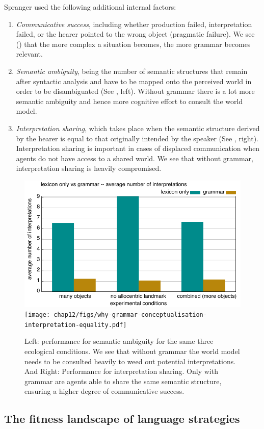Spranger used the following additional internal factors: 
\begin{enumerate}
\item {\itshape Communicative success}, including whether production failed, interpretation failed, or the hearer pointed to the wrong 
object (pragmatic failure). We see () that the more complex a situation becomes, the 
more grammar becomes relevant. 
\item {\itshape Semantic ambiguity}, being the number of semantic structures that remain after syntactic analysis and have to be mapped 
onto the perceived world in order to be disambiguated (See , left). Without grammar there is a lot 
more semantic ambiguity and hence more cognitive effort to consult the world model. 
\item {\itshape Interpretation sharing}, which takes place when the semantic structure derived by the hearer is equal to that originally 
intended by the speaker (See , right). Interpretation sharing is important in cases of displaced 
communication when agents do not have access to a shared world. We see that without grammar, interpretation sharing is 
heavily compromised. 
\end{enumerate}


\begin{figure}
\centerline{\includegraphics[width=0.5\linewidth]{chap12/figs/why-grammar-german-avg-interpretations.pdf}
\texttt{[image: chap12/figs/why-grammar-conceptualisation-interpretation-equality.pdf]}}
\caption{Left: performance for semantic ambiguity for the same three ecological conditions. We see that without grammar
the world model needs to be consulted heavily to weed out potential interpretations. And Right: Performance for interpretation sharing.
Only with grammar are agents able to share the same semantic structure, ensuring a higher degree of communicative success.}
\label{fig:ambiguity}
\end{figure}

\subsection{The fitness landscape of language strategies}

